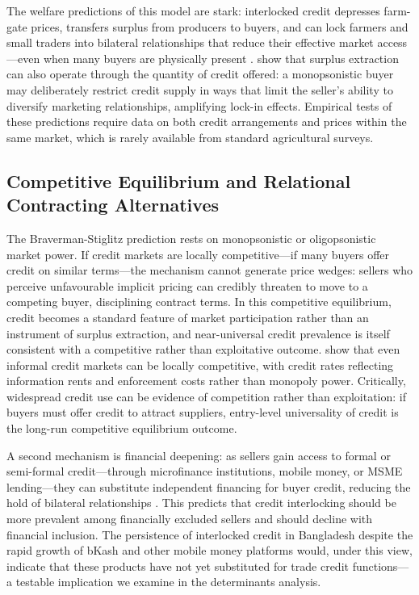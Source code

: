 \documentclass[authoryear,preprint,review,12pt]{elsarticle}
\begin{document}
The welfare predictions of this model are stark: interlocked credit depresses
farm-gate prices, transfers surplus from producers to buyers, and can lock
farmers and small traders into bilateral relationships that reduce their
effective market access---even when many buyers are physically present
\citep{crow_murshid1992}. \citet{ray_sengupta1989} show that surplus extraction
can also operate through the quantity of credit offered: a monopsonistic buyer
may deliberately restrict credit supply in ways that limit the seller's ability
to diversify marketing relationships, amplifying lock-in effects. Empirical
tests of these predictions require data on both credit arrangements and prices
within the same market, which is rarely available from standard agricultural
surveys.

\subsection{Competitive Equilibrium and Relational Contracting Alternatives}

The Braverman-Stiglitz prediction rests on monopsonistic or oligopsonistic
market power. If credit markets are locally competitive---if many buyers offer
credit on similar terms---the mechanism cannot generate price wedges: sellers
who perceive unfavourable implicit pricing can credibly threaten to move to
a competing buyer, disciplining contract terms. In this competitive equilibrium,
credit becomes a standard feature of market participation rather than an
instrument of surplus extraction, and near-universal credit prevalence is
itself consistent with a competitive rather than exploitative outcome.
\citet{hoff_stiglitz1990} show that even informal credit markets can be
locally competitive, with credit rates reflecting information rents and
enforcement costs rather than monopoly power. Critically, widespread credit
use can be evidence of competition rather than exploitation: if buyers must
offer credit to attract suppliers, entry-level universality of credit is
the long-run competitive equilibrium outcome.

A second mechanism is financial deepening: as sellers gain access to formal
or semi-formal credit---through microfinance institutions, mobile money, or
MSME lending---they can substitute independent financing for buyer credit,
reducing the hold of bilateral relationships \citep{conning_udry2007,
karlan_etal2014}. This predicts that credit interlocking should be more
prevalent among financially excluded sellers and should decline with
financial inclusion. The persistence of interlocked credit in Bangladesh
despite the rapid growth of bKash and other mobile money platforms would,
under this view, indicate that these products have not yet substituted for
trade credit functions---a testable implication we examine in the determinants
analysis.
\end{document}
